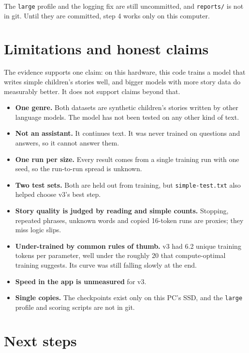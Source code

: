 \documentclass[11pt,a4paper]{article}
\newcommand{\code}[1]{\texttt{#1}}
\begin{document}
The \code{large} profile and the logging fix are still uncommitted, and \code{reports/\allowbreak{}} is not in git. Until they are committed, step 4 works only on this computer.

\section*{Limitations and honest claims}
{}

The evidence supports one claim: on this hardware, this code trains a model that writes simple children's stories well, and bigger models with more story data do measurably better. It does not support claims beyond that.

\begin{itemize}
\item \textbf{One genre.} Both datasets are synthetic children's stories written by other language models. The model has not been tested on any other kind of text.
\item \textbf{Not an assistant.} It continues text. It was never trained on questions and answers, so it cannot answer them.
\item \textbf{One run per size.} Every result comes from a single training run with one seed, so the run-to-run spread is unknown.
\item \textbf{Two test sets.} Both are held out from training, but \code{simple-\allowbreak{}test.\allowbreak{}txt} also helped choose v3's best step.
\item \textbf{Story quality is judged by reading and simple counts.} Stopping, repeated phrases, unknown words and copied 16-token runs are proxies; they miss logic slips.
\item \textbf{Under-trained by common rules of thumb.} v3 had 6.2 unique training tokens per parameter, well under the roughly 20 that compute-optimal training suggests. Its curve was still falling slowly at the end.
\item \textbf{Speed in the app is unmeasured} for v3.
\item \textbf{Single copies.} The checkpoints exist only on this PC's SSD, and the \code{large} profile and scoring scripts are not in git.
\end{itemize}

\section*{Next steps}
{}
\end{document}
